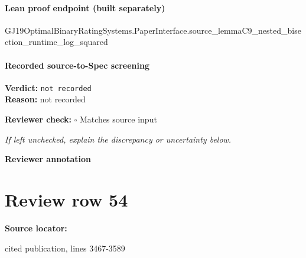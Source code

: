 \documentclass[10pt]{article}
\newcommand{\reviewerbox}{%
  \par\noindent\fbox{\parbox{0.96\linewidth}{\rule{0pt}{0.38in}}}\par
}
\newcommand{\reviewmatch}[1]{%
  \par\noindent\textbf{Reviewer check:} $\square$\; #1\par
  \noindent\emph{If left unchecked, explain the discrepancy or uncertainty below.}\par
}
\begin{document}
\paragraph{Lean proof endpoint (built separately)}\begin{ReviewVerbatim}
GJ19OptimalBinaryRatingSystems.PaperInterface.source_lemmaC9_nested_bisection_runtime_log_squared
\end{ReviewVerbatim}

\paragraph{Recorded source-to-Spec screening}
\textbf{Verdict:} \texttt{not recorded}
\\
\textbf{Reason:} not recorded
\reviewmatch{Matches source input}
\noindent\textbf{Reviewer annotation}\par
\reviewerbox
\clearpage
\hypertarget{source-claim-51c42bc84b84361b}{}
\section*{Review row 54}
\textbf{Source locator:} {\footnotesize\raggedright cited publication, lines 3467-\allowbreak{}3589\par}
\end{document}
